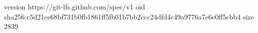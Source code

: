 version https://git-lfs.github.com/spec/v1
oid sha256:c5d21ce68bf731b0fb1861ff5fb01b7bb2ccc24dfd4c49a9776a7e6e0ff5cbb4
size 2839
